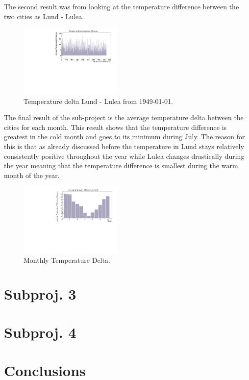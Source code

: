\documentclass[aps,prl,groupedaddress,twocolumn]{revtex4-1}
\begin{document}
The second result was from looking at the temperature difference between the two cities as Lund - Lulea.
\begin{figure}[h!]
    \includegraphics[width=0.45\textwidth]{temperaturedeltaLundLulea.pdf}
    \caption{Temperature delta Lund - Lulea from 1949-01-01.}
    \label{fig:monthlyDelta}
\end{figure}
The final result of the sub-project is the average temperature delta between the cities for each month. This result shows that the temperature difference is greatest in the cold month and goes to its minimum during July. The reason for this is that as already discussed before the temperature in Lund stays relatively consistently positive throughout the year while Lulea changes drastically during the year meaning that the temperature difference is smallest during the warm month of the year.
\begin{figure}[h!]
    \includegraphics[width=0.45\textwidth]{tempDeltaByMonth.pdf}
    \caption{Monthly Temperature Delta.}
    \label{fig:tempDelta}
\end{figure}




\section{Subproj. 3}

\section{Subproj. 4}



\section{Conclusions}
\end{document}
